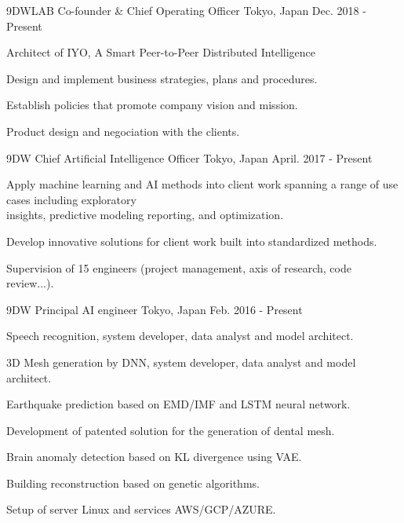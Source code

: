 \begin{cventries}
  \cventry
    {9DWLAB}
    {Co-founder \& Chief Operating Officer}
    {Tokyo, Japan}
    {Dec. 2018 - Present}
    {
      \begin{cvitems}
        \item {Architect of IYO, A Smart Peer-to-Peer Distributed Intelligence}
        \item {Design and implement business strategies, plans and procedures.}
        \item {Establish policies that promote company vision and mission.}
        \item {Product design and negociation with the clients.}
      \end{cvitems}
    }
    \cventry
    {9DW}
    {Chief Artificial Intelligence Officer}
    {Tokyo, Japan}
    {April. 2017 - Present}
    {
      \begin{cvitems}
        \item {Apply machine learning and AI methods into client work spanning a range of use cases including exploratory\\
         insights, predictive modeling reporting, and optimization.}
        \item {Develop innovative solutions for client work built into standardized methods.}
        \item {Supervision of 15 engineers (project management, axis of research, code review...).}
      \end{cvitems}
    }
    \cventry
    {9DW}
    {Principal AI engineer}
    {Tokyo, Japan}
    {Feb. 2016 - Present}
    {
      \begin{cvitems}
        \item {Speech recognition, system developer, data analyst and model architect.}
        \item {3D Mesh generation by DNN, system developer, data analyst and model architect.}
        \item {Earthquake prediction based on EMD/IMF and LSTM neural network.}
        \item {Development of patented solution for the generation of dental mesh.}
        \item {Brain anomaly detection based on KL divergence using VAE.}
        \item {Building reconstruction based on genetic algorithms.}
        \item {Setup of server Linux and services AWS/GCP/AZURE.}
      \end{cvitems}
}
\end{cventries}
